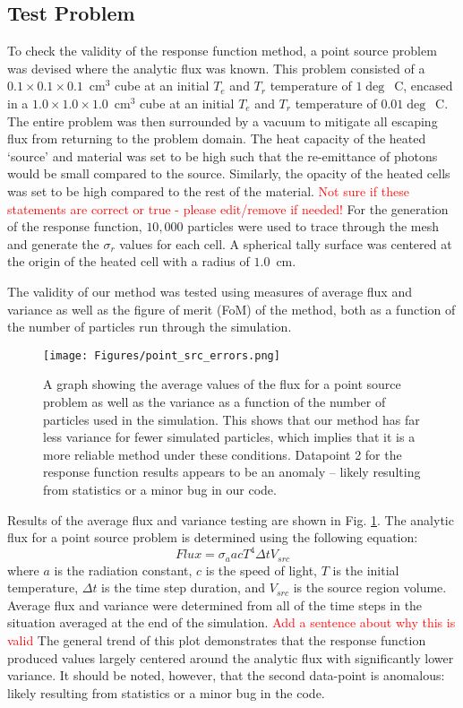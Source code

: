 \begin{chapabstract}
\section{Test Problem}
To check the validity of the response function method, a point source problem was devised where the analytic flux was known. This problem consisted of a $0.1 \times 0.1 \times 0.1$~cm$^3$ cube at an initial $T_{e}$ and $T_{r}$ temperature of $1 \deg$~C, encased in a $1.0 \times 1.0 \times 1.0$~cm$^3$ cube at an initial $T_{e}$ and $T_{r}$ temperature of $0.01 \deg$~C. The entire problem was then surrounded by a vacuum to mitigate all escaping flux from returning to the problem domain. The heat capacity of the heated `source' and material was set to be high such that the re-emittance of photons would be small compared to the source. Similarly, the opacity of the heated cells was set to be high compared to the rest of the material. \textcolor{red}{Not sure if these statements are correct or true - please edit/remove if needed!} For the generation of the response function, $10,000$ particles were used to trace through the mesh and generate the $\sigma_{r}$ values for each cell. A spherical tally surface was centered at the origin of the heated cell with a radius of $1.0$~cm. 

The validity of our method was tested using measures of average flux and variance as well as the figure of merit (FoM) of the method, both as a function of the number of particles run through the simulation. 

\begin{figure} [h!]
	\centering
	\texttt{[image: Figures/point\_src\_errors.png]}
	\caption{A graph showing the average values of the flux for a point source problem as well as the variance as a function of the number of particles used in the simulation. This shows that our method has far less variance for fewer simulated particles, which implies that it is a more reliable method under these conditions. Datapoint 2 for the response function results appears to be an anomaly – likely resulting from statistics or a minor bug in our code.}
	\label{fig:point_source_errors}
\end{figure}

Results of the average flux and variance testing are shown in Fig. \ref{fig:point_source_errors}. The analytic flux for a point source problem is determined using the following equation:
\begin{equation}
Flux = \sigma_{a}  a  c T^{4} \Delta t V_{src}
\end{equation}
where $a$ is the radiation constant, $c$ is the speed of light, $T$ is the initial temperature, $\Delta t$ is the time step duration, and $V_{src}$ is the source region volume. Average flux and variance were determined from all of the time steps in the situation averaged at the end of the simulation. \textcolor{red}{Add a sentence about why this is valid} The general trend of this plot demonstrates that the response function produced values largely centered around the analytic flux with significantly lower variance. It should be noted, however, that the second data-point is anomalous: likely resulting from statistics or a minor bug in the code. 


\end{chapabstract}
